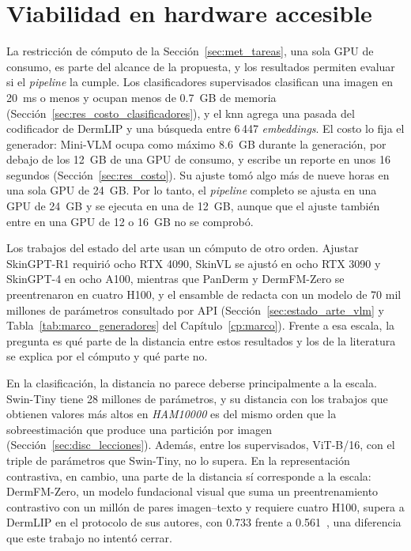 \section{Viabilidad en hardware accesible}
\label{sec:disc_hardware}

La restricción de cómputo de la Sección~\ref{sec:met_tareas}, una sola GPU de consumo, es parte del alcance de la
propuesta, y los resultados permiten evaluar si el \emph{pipeline} la cumple. Los clasificadores supervisados
clasifican una imagen en 20~ms o menos y ocupan menos de 0.7~GB de memoria
(Sección~\ref{sec:res_costo_clasificadores}), y el \gls{knn} agrega una pasada del codificador de DermLIP y una
búsqueda entre 6\,447 \emph{embeddings}. El costo lo fija el generador: Mini-VLM ocupa como máximo 8.6~GB durante la
generación, por debajo de los 12~GB de una GPU de consumo, y escribe un reporte en unos 16 segundos
(Sección~\ref{sec:res_costo}). Su ajuste tomó algo más de nueve horas en una sola GPU de 24~GB. Por lo tanto, el
\emph{pipeline} completo se ajusta en una GPU de 24~GB y se ejecuta en una de 12~GB, aunque que el ajuste también
entre en una GPU de 12 o 16~GB no se comprobó.

Los trabajos del estado del arte usan un cómputo de otro orden. Ajustar SkinGPT-R1 requirió ocho RTX 4090, SkinVL se
ajustó en ocho RTX 3090 y SkinGPT-4 en ocho A100, mientras que PanDerm y DermFM-Zero se preentrenaron en cuatro H100, y
el ensamble de \textcite{khan2025ensemble} redacta con un modelo de 70 mil millones de parámetros consultado por API
(Sección~\ref{sec:estado_arte_vlm} y Tabla~\ref{tab:marco_generadores} del Capítulo~\ref{cp:marco}). Frente a esa
escala, la pregunta es qué parte de la distancia entre estos resultados y los de la literatura se explica por el
cómputo y qué parte no.

En la clasificación, la distancia no parece deberse principalmente a la escala. Swin-Tiny tiene 28 millones de
parámetros, y su distancia con los trabajos que obtienen valores más altos en \emph{HAM10000} es del mismo orden que la
sobreestimación que produce una partición por imagen (Sección~\ref{sec:disc_lecciones}). Además, entre los
supervisados, ViT-B/16, con el triple de parámetros que Swin-Tiny, no lo supera. En la representación contrastiva, en
cambio, una parte de la distancia sí corresponde a la escala: DermFM-Zero, un modelo fundacional visual que suma un
preentrenamiento contrastivo con un millón de pares imagen--texto y requiere cuatro H100, supera a DermLIP en el protocolo de sus autores, con 0.733 frente a
0.561~\cite{yan2026dermfmzero}, una diferencia que este trabajo no intentó cerrar.

